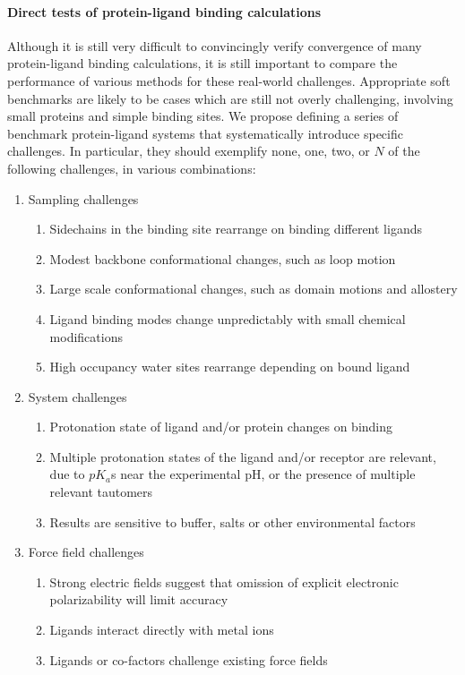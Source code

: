 \documentclass[aps,pre,twocolumn,nofootinbib,superscriptaddress,10pt, final,tightenlines]{revtex4-1}
\begin{document}
\paragraph{Direct tests of protein-ligand binding calculations}
Although it is still very difficult to convincingly verify convergence of many protein-ligand binding calculations, it is still important to compare the performance of various methods for these real-world challenges. 
Appropriate soft benchmarks are likely to be cases which are still not overly challenging, involving small proteins and simple binding sites.
We propose defining a series of benchmark protein-ligand systems that systematically introduce specific challenges. 
In particular, they should exemplify none, one, two, or $N$ of the following challenges, in various combinations:
\begin{enumerate}
\item Sampling challenges
  \begin{enumerate}
  \item Sidechains in the binding site rearrange on binding different ligands
  \item Modest backbone conformational changes, such as loop motion
  \item Large scale conformational changes, such as domain motions and allostery
  \item Ligand binding modes change unpredictably with small chemical modifications
  \item High occupancy water sites rearrange depending on bound ligand
  \end{enumerate}
\item System challenges
  \begin{enumerate}
  \item Protonation state of ligand and/or protein changes on binding
  \item Multiple protonation states of the ligand and/or receptor are relevant, due to $pK_a$s near the experimental pH, or the presence of multiple relevant tautomers
  \item Results are sensitive to buffer, salts or other environmental factors
\end{enumerate}
\item Force field challenges
  \begin{enumerate}
  \item Strong electric fields suggest that omission of explicit electronic polarizability will limit accuracy
  \item Ligands interact directly with metal ions
  \item Ligands or co-factors challenge existing force fields
\end{enumerate}
\end{enumerate}
\end{document}
